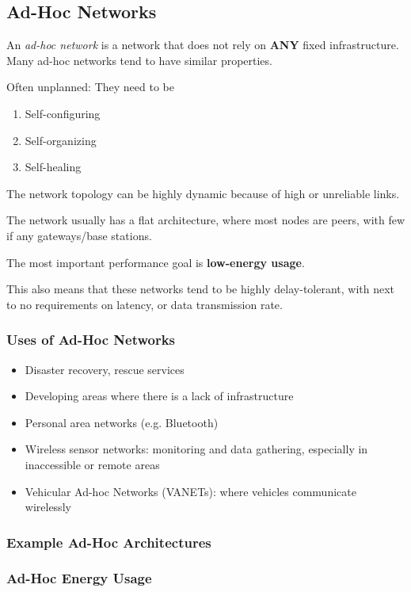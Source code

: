 \subsection{Ad-Hoc Networks}\label{subsec:Ad_Hoc_Networks}
\begin{definition}\label{def:Ad_Hoc_Network}
  An \emph{ad-hoc network} is a network that does not rely on \textbf{ANY} fixed infrastructure.
  Many ad-hoc networks tend to have similar properties.
  \begin{propertylist}
  \item Often unplanned: They need to be
    \begin{enumerate}[noitemsep]
    \item Self-configuring
    \item Self-organizing
    \item Self-healing
    \end{enumerate}

  \item The network topology can be highly dynamic because of high  or unreliable links.
  \item The network usually has a flat architecture, where most nodes are peers, with few if any gateways/base stations.
  \item The most important performance goal is \textbf{low-energy usage}.
  \end{propertylist}

  This also means that these networks tend to be highly delay-tolerant, with next to no requirements on latency, or data transmission rate.
\end{definition}

\subsubsection{Uses of Ad-Hoc Networks}\label{subsubsec:Uses_Ad_Hoc_Network}
\begin{itemize}[noitemsep]
\item Disaster recovery, rescue services
\item Developing areas where there is a lack of infrastructure
\item Personal area networks (e.g. Bluetooth)
\item Wireless sensor networks: monitoring and data gathering, especially in inaccessible or remote areas
\item Vehicular Ad-hoc Networks (VANETs): where vehicles communicate wirelessly
\end{itemize}

\subsubsection{Example Ad-Hoc Architectures}\label{subsubsec:Ad_Hoc_Architectures}
\subsubsection{Ad-Hoc Energy Usage}\label{subsubsec:Ad_Hoc_Architectures}

